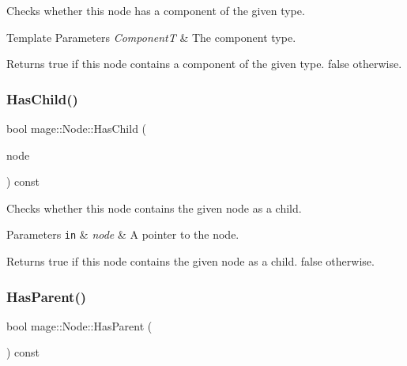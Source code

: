 Checks whether this node has a component of the given type.


\begin{DoxyTemplParams}{Template Parameters}
{\em ComponentT} & The component type. \\
\hline
\end{DoxyTemplParams}
\begin{DoxyReturn}{Returns}
{\ttfamily true} if this node contains a component of the given type. {\ttfamily false} otherwise. 
\end{DoxyReturn}
\hypertarget{classmage_1_1_node_ab75d538a04736033df80747f16744f3a}{}\label{classmage_1_1_node_ab75d538a04736033df80747f16744f3a} 
\subsubsection{\texorpdfstring{Has\+Child()}{HasChild()}}
{\footnotesize\ttfamily bool mage\+::\+Node\+::\+Has\+Child (\begin{DoxyParamCaption}\item[{\hyperlink{classmage_1_1_proxy_ptr}{Proxy\+Ptr}$<$ const \hyperlink{classmage_1_1_node}{Node} $>$}]{node }\end{DoxyParamCaption}) const}

Checks whether this node contains the given node as a child.


\begin{DoxyParams}[1]{Parameters}
\mbox{\tt in}  & {\em node} & A pointer to the node. \\
\hline
\end{DoxyParams}
\begin{DoxyReturn}{Returns}
{\ttfamily true} if this node contains the given node as a child. {\ttfamily false} otherwise. 
\end{DoxyReturn}
\hypertarget{classmage_1_1_node_a2c1fe63ec1cb15321f0b0f5879227dcd}{}\label{classmage_1_1_node_a2c1fe63ec1cb15321f0b0f5879227dcd} 
\subsubsection{\texorpdfstring{Has\+Parent()}{HasParent()}}
{\footnotesize\ttfamily bool mage\+::\+Node\+::\+Has\+Parent (\begin{DoxyParamCaption}{ }\end{DoxyParamCaption}) const\hspace{0.3cm}{\ttfamily [noexcept]}}

